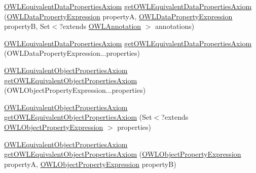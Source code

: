 \begin{DoxyCompactItemize}
\item 
\hyperlink{interfaceorg_1_1semanticweb_1_1owlapi_1_1model_1_1_o_w_l_equivalent_data_properties_axiom}{O\-W\-L\-Equivalent\-Data\-Properties\-Axiom} \hyperlink{classuk_1_1ac_1_1manchester_1_1cs_1_1owl_1_1owlapi_1_1_o_w_l_data_factory_impl_a6f7f48f81ebf3d3db9a94db57b0371c0}{get\-O\-W\-L\-Equivalent\-Data\-Properties\-Axiom} (\hyperlink{interfaceorg_1_1semanticweb_1_1owlapi_1_1model_1_1_o_w_l_data_property_expression}{O\-W\-L\-Data\-Property\-Expression} property\-A, \hyperlink{interfaceorg_1_1semanticweb_1_1owlapi_1_1model_1_1_o_w_l_data_property_expression}{O\-W\-L\-Data\-Property\-Expression} property\-B, Set$<$?extends \hyperlink{interfaceorg_1_1semanticweb_1_1owlapi_1_1model_1_1_o_w_l_annotation}{O\-W\-L\-Annotation} $>$ annotations)
\item 
\hyperlink{interfaceorg_1_1semanticweb_1_1owlapi_1_1model_1_1_o_w_l_equivalent_data_properties_axiom}{O\-W\-L\-Equivalent\-Data\-Properties\-Axiom} \hyperlink{classuk_1_1ac_1_1manchester_1_1cs_1_1owl_1_1owlapi_1_1_o_w_l_data_factory_impl_ad7ea21f6363a5b35cd58631be0784866}{get\-O\-W\-L\-Equivalent\-Data\-Properties\-Axiom} (O\-W\-L\-Data\-Property\-Expression...\-properties)
\item 
\hyperlink{interfaceorg_1_1semanticweb_1_1owlapi_1_1model_1_1_o_w_l_equivalent_object_properties_axiom}{O\-W\-L\-Equivalent\-Object\-Properties\-Axiom} \hyperlink{classuk_1_1ac_1_1manchester_1_1cs_1_1owl_1_1owlapi_1_1_o_w_l_data_factory_impl_ade81d80334abf97aa1c5c1e2ab0e6544}{get\-O\-W\-L\-Equivalent\-Object\-Properties\-Axiom} (O\-W\-L\-Object\-Property\-Expression...\-properties)
\item 
\hyperlink{interfaceorg_1_1semanticweb_1_1owlapi_1_1model_1_1_o_w_l_equivalent_object_properties_axiom}{O\-W\-L\-Equivalent\-Object\-Properties\-Axiom} \hyperlink{classuk_1_1ac_1_1manchester_1_1cs_1_1owl_1_1owlapi_1_1_o_w_l_data_factory_impl_a85e68b5f5e35464ddca105ce7ac42a84}{get\-O\-W\-L\-Equivalent\-Object\-Properties\-Axiom} (Set$<$?extends \hyperlink{interfaceorg_1_1semanticweb_1_1owlapi_1_1model_1_1_o_w_l_object_property_expression}{O\-W\-L\-Object\-Property\-Expression} $>$ properties)
\item 
\hyperlink{interfaceorg_1_1semanticweb_1_1owlapi_1_1model_1_1_o_w_l_equivalent_object_properties_axiom}{O\-W\-L\-Equivalent\-Object\-Properties\-Axiom} \hyperlink{classuk_1_1ac_1_1manchester_1_1cs_1_1owl_1_1owlapi_1_1_o_w_l_data_factory_impl_a68eb5f143467fb0f1f6ae1dd25e0343e}{get\-O\-W\-L\-Equivalent\-Object\-Properties\-Axiom} (\hyperlink{interfaceorg_1_1semanticweb_1_1owlapi_1_1model_1_1_o_w_l_object_property_expression}{O\-W\-L\-Object\-Property\-Expression} property\-A, \hyperlink{interfaceorg_1_1semanticweb_1_1owlapi_1_1model_1_1_o_w_l_object_property_expression}{O\-W\-L\-Object\-Property\-Expression} property\-B)

\end{DoxyCompactItemize}
